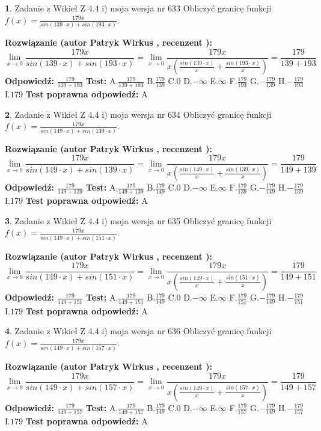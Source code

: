 \documentclass[12pt, a4paper]{article}
\theoremstyle{definition} %
\newtheorem{zad}{}
\newcommand{\zadStart}[1]{\begin{zad}#1\newline}
\newcommand{\zadStop}{\end{zad}}
\newcommand{\rozwStart}[2]{\noindent \textbf{Rozwiązanie (autor #1 , recenzent #2): }\newline}
\newcommand{\rozwStop}{\newline}
\newcommand{\odpStart}{\noindent \textbf{Odpowiedź:}\newline}
\newcommand{\odpStop}{\newline}
\newcommand{\testStart}{\noindent \textbf{Test:}\newline}
\newcommand{\testStop}{\newline}
\newcommand{\kluczStart}{\noindent \textbf{Test poprawna odpowiedź:}\newline}
\newcommand{\kluczStop}{\newline}
\begin{document}
\zadStart{Zadanie z Wikieł Z 4.4 i) moja wersja nr 633}
Obliczyć granicę funkcji $f(x)=\frac{179x}{sin(139\cdot x) +sin(193\cdot x)}$.
\zadStop
\rozwStart{Patryk Wirkus}{}
$$\lim\limits_{x\to 0}\frac{179x}{sin(139\cdot x) +sin(193\cdot x)}=\lim\limits_{x\to 0}\frac{179x}{x(\frac{sin(139\cdot x)}{x}+\frac{sin(193\cdot x)}{x})}=\frac{179}{139+193}$$
\rozwStop
\odpStart
$\frac{179}{139+193}$
\odpStop
\testStart
A.$\frac{179}{139+193}$
B.$\frac{179}{139}$
C.$0$
D.$-\infty$
E.$\infty$
F.$\frac{179}{193}$
G.$-\frac{179}{139}$
H.$-\frac{179}{193}$
I.$179$
\testStop
\kluczStart
A
\kluczStop



\zadStart{Zadanie z Wikieł Z 4.4 i) moja wersja nr 634}
Obliczyć granicę funkcji $f(x)=\frac{179x}{sin(149\cdot x) +sin(139\cdot x)}$.
\zadStop
\rozwStart{Patryk Wirkus}{}
$$\lim\limits_{x\to 0}\frac{179x}{sin(149\cdot x) +sin(139\cdot x)}=\lim\limits_{x\to 0}\frac{179x}{x(\frac{sin(149\cdot x)}{x}+\frac{sin(139\cdot x)}{x})}=\frac{179}{149+139}$$
\rozwStop
\odpStart
$\frac{179}{149+139}$
\odpStop
\testStart
A.$\frac{179}{149+139}$
B.$\frac{179}{149}$
C.$0$
D.$-\infty$
E.$\infty$
F.$\frac{179}{139}$
G.$-\frac{179}{149}$
H.$-\frac{179}{139}$
I.$179$
\testStop
\kluczStart
A
\kluczStop



\zadStart{Zadanie z Wikieł Z 4.4 i) moja wersja nr 635}
Obliczyć granicę funkcji $f(x)=\frac{179x}{sin(149\cdot x) +sin(151\cdot x)}$.
\zadStop
\rozwStart{Patryk Wirkus}{}
$$\lim\limits_{x\to 0}\frac{179x}{sin(149\cdot x) +sin(151\cdot x)}=\lim\limits_{x\to 0}\frac{179x}{x(\frac{sin(149\cdot x)}{x}+\frac{sin(151\cdot x)}{x})}=\frac{179}{149+151}$$
\rozwStop
\odpStart
$\frac{179}{149+151}$
\odpStop
\testStart
A.$\frac{179}{149+151}$
B.$\frac{179}{149}$
C.$0$
D.$-\infty$
E.$\infty$
F.$\frac{179}{151}$
G.$-\frac{179}{149}$
H.$-\frac{179}{151}$
I.$179$
\testStop
\kluczStart
A
\kluczStop



\zadStart{Zadanie z Wikieł Z 4.4 i) moja wersja nr 636}
Obliczyć granicę funkcji $f(x)=\frac{179x}{sin(149\cdot x) +sin(157\cdot x)}$.
\zadStop
\rozwStart{Patryk Wirkus}{}
$$\lim\limits_{x\to 0}\frac{179x}{sin(149\cdot x) +sin(157\cdot x)}=\lim\limits_{x\to 0}\frac{179x}{x(\frac{sin(149\cdot x)}{x}+\frac{sin(157\cdot x)}{x})}=\frac{179}{149+157}$$
\rozwStop
\odpStart
$\frac{179}{149+157}$
\odpStop
\testStart
A.$\frac{179}{149+157}$
B.$\frac{179}{149}$
C.$0$
D.$-\infty$
E.$\infty$
F.$\frac{179}{157}$
G.$-\frac{179}{149}$
H.$-\frac{179}{157}$
I.$179$
\testStop
\kluczStart
A
\kluczStop
\end{document}
